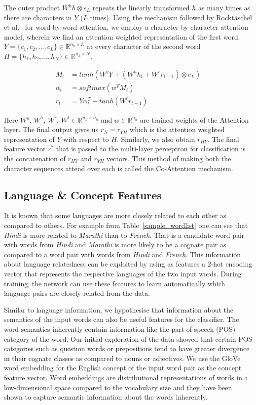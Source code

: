 \documentclass[11pt,letterpaper]{article}
\begin{document}
The outer product $W^hh\otimes e_L$ repeats the linearly transformed $h$ as many times as there are characters in $Y$ ($L$ times). Using the mechanism followed by Rockt\"aschel et al.~ for word-by-word attention, we employ a character-by-character attention model, wherein we find an attention weighted representation of the first word $Y = \{c_1, c_2, ..., c_L\} \in \mathbb{R}^{n_h \times L}$ at every character of the second word $H = \{h_1, h_2, ..., h_N\} \in \mathbb{R}^{n_h \times N}$.

\begin{align}
M_t &= tanh(W^yY + (W^hh_t + W^rr_{t-1})\otimes e_L) \\
\alpha_t &= softmax(w^TM_t) \\
r_t &= Y\alpha_t^T + tanh(W^tr_{t-1})
\end{align}

Here $W^y$, $W^h$, $W^r$, $W^t \in  \mathbb{R}^{n_h \times n_h}$ and $w \in \mathbb{R}^{n_h}$ are trained weights of the Attention layer. The final output gives us $r_N = r_{YH}$ which is the attention weighted representation of $Y$ with respect to $H$. Similarly, we also obtain $r_{HY}$. The final feature vector $r^*$ that is passed to the multi-layer perceptron for classification is the concatenation of $r_{HY}$ and $r_{YH}$ vectors. This method of making both the character sequences attend over each is called the Co-Attention mechanism.
 
\subsection{Language \& Concept Features}

It is known that some languages are more closely related to each other as compared to others. For example from Table~\ref{sample_wordlist} one can see that \textit{Hindi} is more related to \textit{Marathi} than to \textit{French}. That is a candidate word pair with words from \textit{Hindi} and \textit{Marathi} is more likely to be a cognate pair as compared to a word pair with words from \textit{Hindi} and \textit{French}. This information about language relatedness can be exploited by using as features a 2-hot encoding vector that represents the respective languages of the two input words. During training, the network can use these features to learn automatically which language pairs are closely related from the data.

Similar to language information, we hypothesise that information about the semantics of the input words can also be useful features for the classifier. The word semantics inherently contain information like the part-of-speech (POS) category of the word. Our initial exploration of the data showed that certain POS categories such as question words or prepositions tend to have greater divergence in their cognate classes as compared to nouns or adjectives. We use the GloVe word embedding \cite{pennington2014glove} for the English concept of the input word pair as the concept feature vector. Word embeddings are distributional representations of words in a low-dimensional space compared to the vocabulary size and they have been shown to capture semantic information about the words inherently. 
\end{document}
